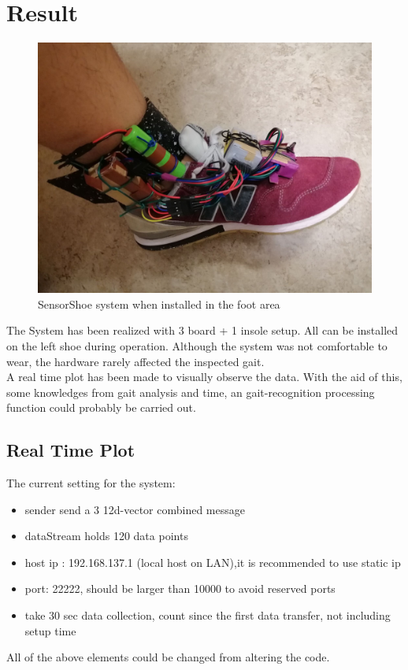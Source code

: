 \documentclass[12 pt, a4paper]{thesis}
\begin{document}
\chapter{Result}
\begin{figure}[hbt!]
\centering
\includegraphics[width=140mm]{shoe2.jpg}
\caption{SensorShoe system when installed in the foot area}
\end{figure}
The System has been realized with 3 board + 1 insole setup. All can be installed on the left shoe during operation. Although the system was not comfortable to wear, the hardware rarely affected the inspected gait.\\
A real time plot has been made to visually observe the data. With the aid of this, some knowledges from gait analysis and time, an gait-recognition processing function could probably be carried out.\\
\section{Real Time Plot}
The current setting for the system:
\begin{itemize}
\item{sender send a 3 12d-vector combined message}
\item{dataStream holds 120 data points}
\item{host ip : 192.168.137.1 (local host on LAN),it is recommended to use static ip}
\item{port: 22222, should be larger than 10000 to avoid reserved ports}
\item{take 30 sec data collection, count since the first data transfer, not including setup time}
\end{itemize}
All of the above elements could be changed from altering the code.
\end{document}
